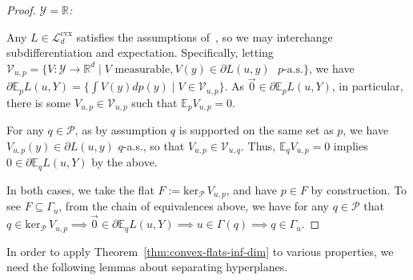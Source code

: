 \documentclass[11pt]{article} %
\newcommand{\Comments}{1}
\newcommand{\mynote}[2]{\ifnum\Comments=1\textcolor{#1}{#2}\fi}
\newcommand{\mytodo}[2]{\ifnum\Comments=1%
	\todo[linecolor=#1!80!black,backgroundcolor=#1,bordercolor=#1!80!black]{#2}\fi}
\newcommand{\jessie}[1]{\mynote{purple}{[JF: #1]}}
\newcommand{\btw}[1]{}%
\newcommand{\reals}{\mathbb{R}}
\newcommand{\supp}{\mathrm{supp}}
\newcommand{\zeros}[1]{\mathrm{ker}_\P\,#1}
\newcommand{\E}{\mathbb{E}}
\newcommand{\Lcvx}{\mathcal{L}^{\mathrm{cvx}}}
\renewcommand{\P}{\mathcal{P}}
\newcommand{\V}{\mathcal{V}}
\newcommand{\Y}{\mathcal{Y}}
\begin{document}
\begin{proof}
	\emph{$\Y=\reals$: }
	\btw{Note: this should work for any infinite $\Y$ so long as you have a good $\sigma$-algebra... working at least with $\Y \subseteq \reals$ just makes things easier since we can take the Borel $\sigma$-algebra for granted.}
	Any $L \in \Lcvx_d$ satisfies the assumptions of~\cite{ioffe1969minimization}, so we may interchange subdifferentiation and expectation.
	Specifically, letting $\V_{u,p} = \{V:\Y\to\reals^d \mid V \text{ measurable}, V(y) \in \partial L(u,y) \text{ $p$-a.s.}\}$, we have
	$\partial \E_p L(u,Y) = \{\int V(y)dp(y) \mid V\in\V_{u,p}\}$.
	As $\vec 0 \in \partial \E_p L(u,Y)$, in particular, there is some $V_{u,p} \in \V_{u,p}$ such that $\E_p V_{u,p} = 0$.
	\btw{Fleshing this out: $\exists E \subseteq \mathcal{B}(\Y)$ so that $p(E) = 0$ and $V(y) \in \partial L(u,y) \forall y \in E^c$.  Claim $q(E) = 0$, which would complete the claim that $V(y) \in \partial L(u,y) q$-a.s.  For contradiction, if $q(E) > 0$, then $\exists x \in E$ and open neighborhood $N_x \ni x$ with $q(N_x) > 0$.  Since $\supp(p) = \supp(q)$, we then have $p(N_x) >0$, contradicting $p(E) = 0$, and hence $V(y) \in \partial L(u,y)$ not $p$-a.s.  Therefore, we must have $q(E) = 0$, so $V(y) \in \partial L(u,y) q$-a.s.}
	For any $q\in\P$, as by assumption $q$ is supported on the same set as $p$, we have $V_{u,p}(y)\in\partial L(u,y)$ $q$-a.s., so that $V_{u,p}\in\V_{u,q}$\btw{I'm a bit too tired to see exactly how this follows, but it seems intuitively obvious. I'm okay to punt on it for the submission, but if someone has time to check, that would be great! \jessie{See above margin comment.  I think it's too much detail for the conference submission, but feel free to change my mind.}}.
	Thus, $\E_q V_{u,p} = 0$ implies $0\in\partial\E_q L(u,Y)$ by the above.
	\btw{For posterity, the bug: we want to conclude $\E_q V_{u,p} = 0 \implies q \in \Gamma_u$.  But the ``a.s.\ in $p$'' means we may not have $0 \in \partial \E_q L(u,Y)$, since maybe $V_{u,p}(y)$ is not in $\partial L(u,y)$ a.s.\ in $q$...}
	
	In both cases, we take the flat $F := \zeros{V_{u,p}}$, and have $p \in F$ by construction.
	To see $F \subseteq \Gamma_u$, from the chain of equivalences above, we have for any $q\in\P$ that $q \in \zeros{V_{u,p}} \implies \vec 0 \in \partial \E_q L(u,Y) \implies u \in \Gamma(q) \implies q \in \Gamma_u$.
\end{proof}

In order to apply Theorem~\ref{thm:convex-flats-inf-dim} to various properties, we need the following lemmas about separating hyperplanes.
\end{document}

